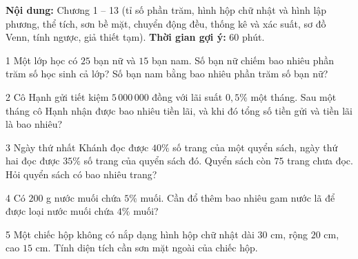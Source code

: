 \begin{knowbox}
\textbf{Nội dung:} Chương 1 -- 13 (tỉ số phần trăm, hình hộp chữ nhật và hình lập phương, thể tích, sơn bề mặt, chuyển động đều, thống kê và xác suất, sơ đồ Venn, tính ngược, giả thiết tạm). \quad \textbf{Thời gian gợi ý:} $60$ phút.
\end{knowbox}
\gap
\begin{probbox}{1}{\relax}
Một lớp học có $25$ bạn nữ và $15$ bạn nam.  Số bạn nữ chiếm bao nhiêu phần trăm số học sinh cả lớp?  Số bạn nam bằng bao nhiêu phần trăm số bạn nữ?
\end{probbox}
\gap
\begin{probbox}{2}{\relax}
Cô Hạnh gửi tiết kiệm $5\,000\,000$ đồng với lãi suất $0{,}5\%$ một tháng. Sau một tháng cô Hạnh nhận được bao nhiêu tiền lãi, và khi đó tổng số tiền gửi và tiền lãi là bao nhiêu?
\end{probbox}
\gap
\begin{probbox}{3}{\relax}
Ngày thứ nhất Khánh đọc được $40\%$ số trang của một quyển sách, ngày thứ hai đọc được $35\%$ số trang của quyển sách đó. Quyển sách còn $75$ trang chưa đọc. Hỏi quyển sách có bao nhiêu trang?
\end{probbox}
\gap
\begin{probbox}{4}{}
Có $200$ g nước muối chứa $5\%$ muối. Cần đổ thêm bao nhiêu gam nước lã để được loại nước muối chứa $4\%$ muối?
\end{probbox}
\gap
\begin{probbox}{5}{\relax}
Một chiếc hộp không có nắp dạng hình hộp chữ nhật dài $30$ cm, rộng $20$ cm, cao $15$ cm. Tính diện tích cần sơn mặt ngoài của chiếc hộp.
\end{probbox}
